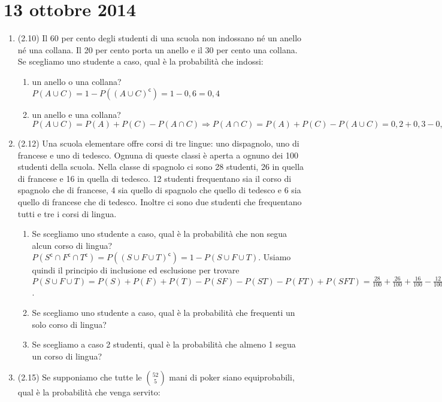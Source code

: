 \section{13 ottobre 2014}

\begin{enumerate}
    \item (2.10) Il 60 per cento degli studenti di una scuola non indossano n\'e un anello n\'e una collana. Il 20 per cento porta un anello e il 30 per cento una collana. Se scegliamo uno studente a caso, qual \`e la probabilit\`a che indossi:
    \begin{enumerate}
        \item un anello o una collana? $P(A \cup C) = 1 - P((A \cup C)^{\mathsf{c}}) = 1 - 0{,}6 = 0{,}4$
        \item un anello e una collana? $P(A \cup C) = P(A) + P(C) - P(A \cap C) \Rightarrow P(A \cap C) = P(A) + P(C) - P(A \cup C) = 0{,}2 + 0{,}3 - 0{,}4 = 0{,}1$
    \end{enumerate}
    \item (2.12) Una scuola elementare offre corsi di tre lingue: uno dispagnolo, uno di francese e uno di tedesco. Ognuna di queste classi \`e aperta a ognuno dei 100 studenti della scuola. Nella classe di spagnolo ci sono 28 studenti, 26 in quella di francese e 16 in quella di tedesco. 12 studenti frequentano sia il corso di spagnolo che di francese, 4 sia quello di spagnolo che quello di tedesco e 6 sia quello di francese che di tedesco. Inoltre ci sono due studenti che frequentano tutti e tre i corsi di lingua.
    \begin{enumerate}
        \item Se scegliamo uno studente a caso, qual \`e la probabilit\`a che non segua alcun corso di lingua? $P(S^{\mathsf{c}} \cap F^{\mathsf{c}} \cap T^{\mathsf{c}}) = P((S \cup F \cup T)^{\mathsf{c}}) = 1 - P(S \cup F \cup T)$. Usiamo quindi il principio di inclusione ed esclusione per trovare $P(S \cup F \cup T) = P(S) + P(F) + P(T) - P(SF) - P(ST) -P(FT) + P(SFT) = \frac{28}{100} + \frac{26}{100} + \frac{16}{100} - \frac{12}{100} - \frac{4}{100} - \frac{6}{100} + \frac{2}{100} = \frac{1}{2}$.
        \item Se scegliamo uno studente a caso, qual \`e la probabilit\`a che frequenti un solo corso di lingua?
        \item Se scegliamo a caso 2 studenti, qual \`e la probabilit\`a che almeno 1 segua un corso di lingua?
    \end{enumerate}
    \item (2.15) Se supponiamo che tutte le $\binom{52}{5}$ mani di poker siano equiprobabili, qual \`e la probabilit\`a che venga servito:

\end{enumerate}
